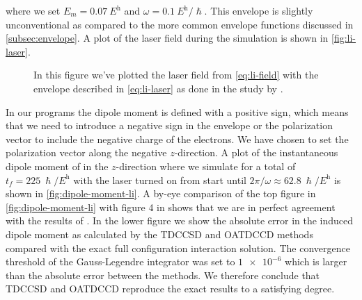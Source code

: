         where we set $E_m = \SI{0.07}{\hartree}$ and $\omega =
        \SI{0.1}{\hartree/\hslash}$.
        This envelope is slightly unconventional as compared to the more
        common envelope functions discussed in \autoref{subsec:envelope}.
        A plot of the laser field during the simulation is shown in
        \autoref{fig:li-laser}.
        \begin{figure}
            \centering
            \caption{In this figure we've plotted the laser field from
            \autoref{eq:li-field} with the envelope described in
            \autoref{eq:li-laser} as done in the study by
            \citeauthor{li_2005} \cite{li_2005}.}
            \label{fig:li-laser}
        \end{figure}
        In our programs the dipole moment is defined with a positive sign,
        which means that we need to introduce a negative sign in the
        envelope or the polarization vector to include the negative charge
        of the electrons.
        We have chosen to set the polarization vector along the negative
        $z$-direction.
        A plot of the instantaneous dipole moment of  in the
        $z$-direction where we simulate for a total of $t_f =
        \SI{225}{\hslash/\hartree}$ with the laser turned on from start
        until $2\pi/\omega \approx \SI{62.8}{\hslash/\hartree}$ is shown in
        \autoref{fig:dipole-moment-li}.
        A by-eye comparison of the top figure in
        \autoref{fig:dipole-moment-li} with figure 4 in 
        \cite{li_2005} shows that we are in perfect agreement with the
        results of \citeauthor{li_2005}.
        In the lower figure we show the absolute error in the induced dipole
        moment as calculated by the TDCCSD and OATDCCD methods compared with
        the exact full configuration interaction solution.
        The convergence threshold of the Gauss-Legendre integrator was set
        to $\num{1e-6}$ which is larger than the absolute error between the
        methods.
        We therefore conclude that TDCCSD and OATDCCD reproduce the exact
        results to a satisfying degree.

